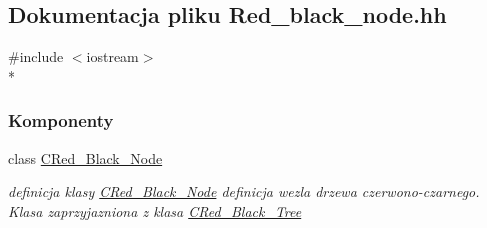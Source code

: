 \hypertarget{_red__black__node_8hh}{}\subsection{Dokumentacja pliku Red\+\_\+black\+\_\+node.\+hh}
\label{_red__black__node_8hh}
{\ttfamily \#include $<$iostream$>$}\\*
\subsubsection*{Komponenty}
\begin{DoxyCompactItemize}
\item 
class \hyperlink{class_c_red___black___node}{C\+Red\+\_\+\+Black\+\_\+\+Node}
\begin{DoxyCompactList}\small\item\em definicja klasy \hyperlink{class_c_red___black___node}{C\+Red\+\_\+\+Black\+\_\+\+Node} definicja wezla drzewa czerwono-\/czarnego. Klasa zaprzyjazniona z klasa \hyperlink{class_c_red___black___tree}{C\+Red\+\_\+\+Black\+\_\+\+Tree} \end{DoxyCompactList}\end{DoxyCompactItemize}
